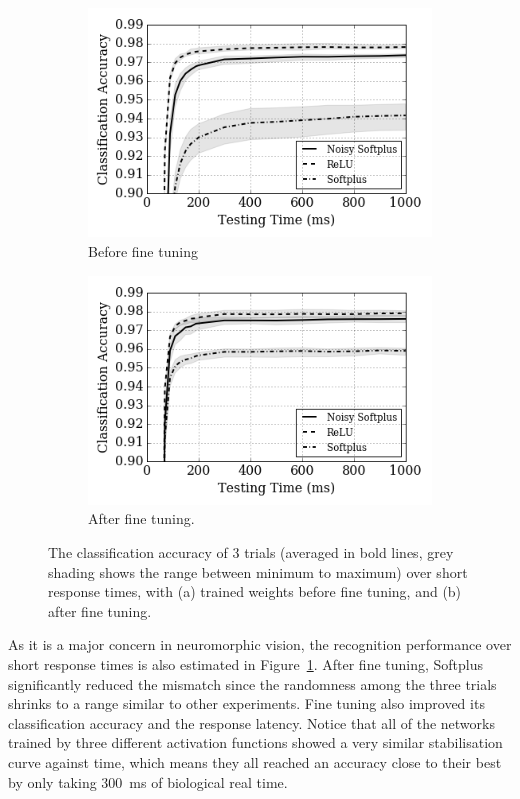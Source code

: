 \documentclass{article}
\begin{document}
\begin{figure}[htb!]
	\centering
	\begin{subfigure}[t]{0.49\textwidth}
		\includegraphics[width=\textwidth]{pics_iconip/8-2.png}
		\caption{Before fine tuning}
	\end{subfigure}
	\begin{subfigure}[t]{0.49\textwidth}
		\includegraphics[width=\textwidth]{pics_iconip/8-3.png}
		\caption{After fine tuning.}
	\end{subfigure}
	
	\caption{The classification accuracy of 3 trials (averaged in bold lines, grey shading shows the range between minimum to maximum) over short response times, with (a) trained weights before fine tuning, and (b) after fine tuning.}
	\label{fig:ca_time}	
\end{figure}

As it is a major concern in neuromorphic vision, the recognition performance over short response times is also estimated in Figure~\ref{fig:ca_time}.
After fine tuning, Softplus significantly reduced the mismatch since the randomness among the three trials shrinks to a range similar to other experiments.
Fine tuning also improved its classification accuracy and the response latency.
Notice that all of the networks trained by three different activation functions showed a very similar stabilisation curve against time, which means they all reached an accuracy close to their best by only taking 300~ms of biological real time. 
\end{document}
